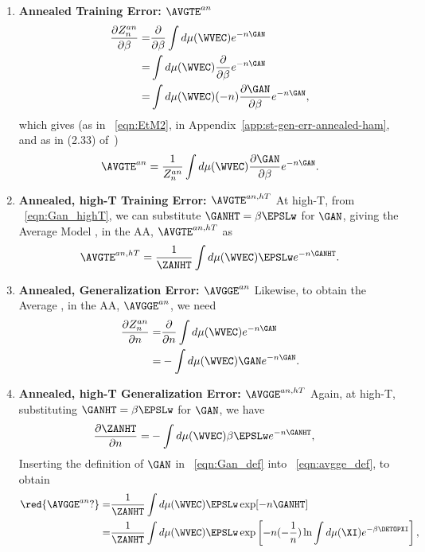 
\begin{enumerate}[label=4.2.5.\arabic*]
\item
\textbf{Annealed Training Error: $\AVGTE^{an}$}
\begin{align}
\nonumber
  \dfrac{\partial Z^{an}_{n}}{\partial \beta}
  = &  \dfrac{\partial }{\partial \beta} \int d\mu(\WVEC) e^{-n\GAN} \\ 
\nonumber
  = & \int d\mu(\WVEC) \dfrac{\partial }{\partial \beta} e^{-n\GAN}\\ 
  = & \int d\mu(\WVEC) (-n) \dfrac{\partial \GAN}{\partial \beta} e^{-n\GAN}  ,
\end{align}
which gives (as in \EQN~\ref{eqn:EtM2}, in Appendix~\ref{app:st-gen-err-annealed-ham}, and as in \EQN(2.33) of~\cite{SST92})
\begin{align}
  \AVGTE^{an} = \frac{1}{Z^{an}_{n}}\int d\mu(\WVEC)  \dfrac{\partial \GAN}{\partial \beta} e^{-n\GAN} .
\end{align}
\item
\textbf{Annealed, high-T Training Error: $\AVGTE^{an,hT}$}
At high-T, from \EQN~\ref{eqn:Gan_highT}, we can substitute $\GANHT=\beta\EPSLw$ for $\GAN$, giving the
Average Model \TrainingError, in the AA, $\AVGTE^{an,hT}$ as
\begin{align}
  \label{eqn:avgte_anhT}
  \AVGTE^{an,hT} = \frac{1}{\ZANHT}\int d\mu(\WVEC) \EPSLw e^{-n\GANHT}  .
\end{align}

\item
\textbf{Annealed, Generalization Error: $\AVGGE^{an}$}
Likewise, to obtain the  Average \ModelGeneralizationError, in the AA, $\AVGGE^{an}$, we need 
\begin{align}
  \dfrac{\partial Z^{an}_{n}}{\partial n}
  = &  \dfrac{\partial }{\partial n} \int d\mu(\WVEC) e^{-n\GAN} \\ \nonumber
  = & - \int d\mu(\WVEC) \GAN e^{-n\GAN}  .
\end{align}

\item
\textbf{Annealed, high-T Generalization Error: $\AVGGE^{an, hT}$}
Again, at high-T, substituting $\GANHT=\beta\EPSLw$ for $\GAN$, we have
\begin{align}
 \dfrac{\partial \ZANHT}{\partial n}
  = & - \int d\mu(\WVEC) \beta \EPSLw e^{-n\GANHT}  ,
\end{align}
Inserting  the definition of $\GAN$ in \EQN~\ref{eqn:Gan_def} into \EQN~\ref{eqn:avgge_def}, to obtain
\begin{align}
\nonumber
 \red{ \AVGGE^{an}?} =& \frac{1}{\ZANHT}\int d\mu(\WVEC) \EPSLw \exp[-n\GANHT] \\ 
\label{eqn:finalEgen0}
  =& \frac{1}{\ZANHT}\int d\mu(\WVEC) \EPSLw \exp\left[-n(-\frac{1}{n})\ln  \int d\mu(\XI)e^{-\beta \DETOPXI}\right]  ,
\end{align}


\end{enumerate}
